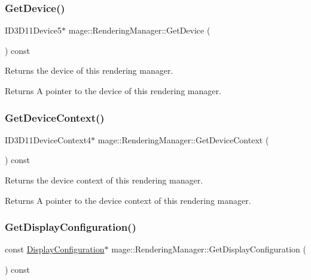 \subsubsection{\texorpdfstring{Get\+Device()}{GetDevice()}}
{\footnotesize\ttfamily I\+D3\+D11\+Device5$\ast$ mage\+::\+Rendering\+Manager\+::\+Get\+Device (\begin{DoxyParamCaption}{ }\end{DoxyParamCaption}) const\hspace{0.3cm}{\ttfamily [noexcept]}}

Returns the device of this rendering manager.

\begin{DoxyReturn}{Returns}
A pointer to the device of this rendering manager. 
\end{DoxyReturn}
\hypertarget{classmage_1_1_rendering_manager_a8067ea5d29a3f986dfdbd90ed1b956ee}{}\label{classmage_1_1_rendering_manager_a8067ea5d29a3f986dfdbd90ed1b956ee} 
\subsubsection{\texorpdfstring{Get\+Device\+Context()}{GetDeviceContext()}}
{\footnotesize\ttfamily I\+D3\+D11\+Device\+Context4$\ast$ mage\+::\+Rendering\+Manager\+::\+Get\+Device\+Context (\begin{DoxyParamCaption}{ }\end{DoxyParamCaption}) const\hspace{0.3cm}{\ttfamily [noexcept]}}

Returns the device context of this rendering manager.

\begin{DoxyReturn}{Returns}
A pointer to the device context of this rendering manager. 
\end{DoxyReturn}
\hypertarget{classmage_1_1_rendering_manager_a4d134773977675c902974bb3f914370e}{}\label{classmage_1_1_rendering_manager_a4d134773977675c902974bb3f914370e} 
\subsubsection{\texorpdfstring{Get\+Display\+Configuration()}{GetDisplayConfiguration()}}
{\footnotesize\ttfamily const \hyperlink{structmage_1_1_display_configuration}{Display\+Configuration}$\ast$ mage\+::\+Rendering\+Manager\+::\+Get\+Display\+Configuration (\begin{DoxyParamCaption}{ }\end{DoxyParamCaption}) const\hspace{0.3cm}{\ttfamily [noexcept]}}

